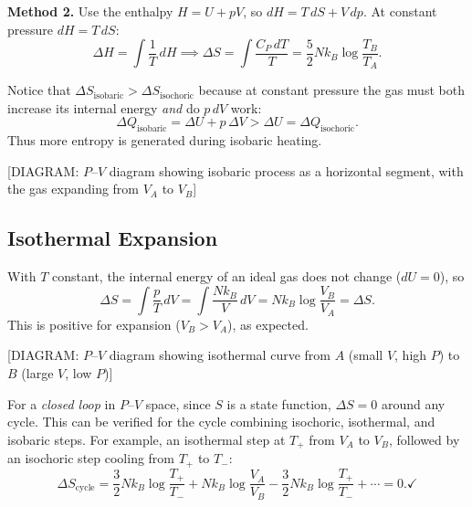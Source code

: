 \textbf{Method 2.} Use the enthalpy $H = U + pV$, so $dH = T\,dS + V\,dp$. At constant pressure $dH = T\,dS$:
\begin{equation}
    \Delta H = \int \frac{1}{T}\,dH \implies \Delta S = \int \frac{C_P\,dT}{T} = \frac{5}{2}Nk_B\log\frac{T_B}{T_A}.
\end{equation}

Notice that $\Delta S_\text{isobaric} > \Delta S_\text{isochoric}$ because at constant pressure the gas must both increase its internal energy \emph{and} do $p\,dV$ work:
\begin{equation}
    \Delta Q_\text{isobaric} = \Delta U + p\,\Delta V > \Delta U = \Delta Q_\text{isochoric}.
\end{equation}
Thus more entropy is generated during isobaric heating.

\begin{center}[DIAGRAM: $P$--$V$ diagram showing isobaric process as a horizontal segment, with the gas expanding from $V_A$ to $V_B$]\end{center}

\subsection{Isothermal Expansion}

With $T$ constant, the internal energy of an ideal gas does not change ($dU = 0$), so
\begin{equation}
    \Delta S = \int \frac{p}{T}\,dV = \int \frac{Nk_B}{V}\,dV = Nk_B\log\frac{V_B}{V_A} = \Delta S.
\end{equation}
This is positive for expansion ($V_B > V_A$), as expected.

\begin{center}[DIAGRAM: $P$--$V$ diagram showing isothermal curve from $A$ (small $V$, high $P$) to $B$ (large $V$, low $P$)]\end{center}

For a \emph{closed loop} in $P$--$V$ space, since $S$ is a state function, $\Delta S = 0$ around any cycle. This can be verified for the cycle combining isochoric, isothermal, and isobaric steps. For example, an isothermal step at $T_+$ from $V_A$ to $V_B$, followed by an isochoric step cooling from $T_+$ to $T_-$:
\begin{equation}
    \Delta S_\text{cycle} = \frac{3}{2}Nk_B\log\frac{T_+}{T_-} + Nk_B\log\frac{V_A}{V_B}
    - \frac{3}{2}Nk_B\log\frac{T_+}{T_-} + \cdots = 0. \checkmark
\end{equation}

